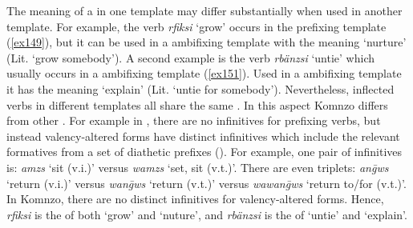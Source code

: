 The meaning of a  in one template may differ substantially when used in another template. For example, the verb \emph{rfiksi} `grow' occurs in the prefixing template (\ref{ex149}), but it can be used in a  ambifixing template with the meaning `nurture' (Lit. `grow somebody'). A second example is the verb \emph{rbänzsi} `untie' which usually occurs in a  ambifixing template (\ref{ex151}). Used in a  ambifixing template it has the meaning `explain' (Lit. `untie for somebody'). Nevertheless, inflected verbs in different templates all share the same . In this aspect Komnzo differs from other . For example in , there are no infinitives for prefixing verbs, but instead valency-altered forms have distinct infinitives which include the relevant formatives from a set of diathetic prefixes (\citealt{Evans:2015wy}). For example, one pair of infinitives is: \emph{amzs} `sit (v.i.)' versus \emph{wamzs} `set, sit (v.t.)'. There are even triplets: \emph{an\={g}ws} `return (v.i.)' versus \emph{wan\={g}ws} `return (v.t.)' versus \emph{wawan\={g}ws} `return to/for (v.t.)'. In Komnzo, there are no distinct infinitives for valency-altered forms. Hence, \emph{rfiksi} is the  of both `grow' and `nuture', and \emph{rbänzsi} is the  of `untie' and `explain'.%

